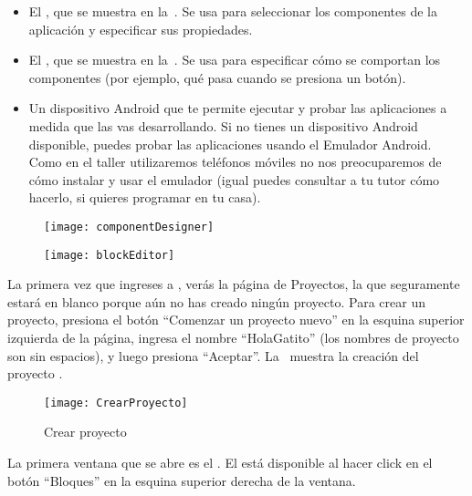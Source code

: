 \begin{itemize}

\item El \componentDesigner, que se muestra en la~. Se usa para seleccionar los componentes de la
  aplicación y especificar sus propiedades.

\item El \blockEditor, que se muestra en la~. Se
  usa para especificar cómo se comportan los componentes (por ejemplo,
  qué pasa cuando se presiona un botón).

\item Un dispositivo Android que te permite ejecutar y probar las
  aplicaciones a medida que las vas desarrollando. Si no tienes un
  dispositivo Android disponible, puedes probar las aplicaciones
  usando el Emulador Android. Como en el taller utilizaremos teléfonos
  móviles no nos preocuparemos de cómo instalar y usar el emulador
  (igual puedes consultar a tu tutor cómo hacerlo, si quieres
  programar en tu casa).

\end{itemize}

\begin{figure}[H]
\centering
\texttt{[image: componentDesigner]}
\caption{\componentDesigner}
\label{fig:componentDesigner}
\end{figure}

\begin{figure}[H]
\centering
\texttt{[image: blockEditor]}
\caption{\blockEditor}
\label{fig:blockEditor}
\end{figure}

La primera vez que ingreses a \aiurl, verás la página de Proyectos, la
que seguramente estará en blanco porque aún no has creado ningún
proyecto. Para crear un proyecto, presiona el botón ``Comenzar un
proyecto nuevo'' en la esquina superior izquierda de la página,
ingresa el nombre ``HolaGatito'' (los nombres de proyecto son sin
espacios), y luego presiona ``Aceptar''. La~
muestra la creación del proyecto .

\begin{figure}[H]
\centering
\texttt{[image: CrearProyecto]}
\caption{Crear proyecto }
\label{fig:crearProyecto}
\end{figure}

La primera ventana que se abre es el \componentDesigner. El \blockEditor está
disponible al hacer click en el botón ``Bloques'' en la esquina
superior derecha de la ventana.

